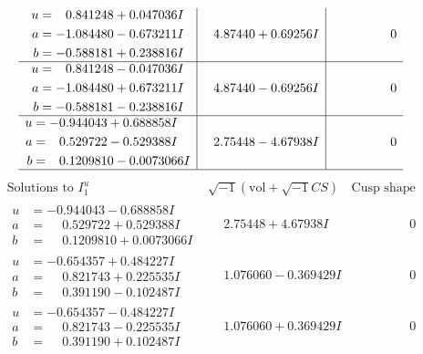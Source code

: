 \documentclass[1p]{elsarticle_modified}
\theoremstyle{definition}
\newcommand{\I}{\sqrt{-1}}
\begin{document}
$$\begin{array}{c|c|c}
\begin{aligned}
u &= \phantom{-}0.841248 + 0.047036 I \\
a &= -1.084480 - 0.673211 I \\
b &= -0.588181 + 0.238816 I\end{aligned}
 & \phantom{-}4.87440 + 0.69256 I & \phantom{-0.000000 } 0 \\ \hline\begin{aligned}
u &= \phantom{-}0.841248 - 0.047036 I \\
a &= -1.084480 + 0.673211 I \\
b &= -0.588181 - 0.238816 I\end{aligned}
 & \phantom{-}4.87440 - 0.69256 I & \phantom{-0.000000 } 0 \\ \hline\begin{aligned}
u &= -0.944043 + 0.688858 I \\
a &= \phantom{-}0.529722 - 0.529388 I \\
b &= \phantom{-}0.1209810 - 0.0073066 I\end{aligned}
 & \phantom{-}2.75448 - 4.67938 I & \phantom{-0.000000 } 0\\
 \hline 
 \end{array}$$\newpage$$\begin{array}{c|c|c}  
\text{Solutions to }I^u_{1}& \I (\text{vol} + \sqrt{-1}CS) & \text{Cusp shape}\\
 \hline 
\begin{aligned}
u &= -0.944043 - 0.688858 I \\
a &= \phantom{-}0.529722 + 0.529388 I \\
b &= \phantom{-}0.1209810 + 0.0073066 I\end{aligned}
 & \phantom{-}2.75448 + 4.67938 I & \phantom{-0.000000 } 0 \\ \hline\begin{aligned}
u &= -0.654357 + 0.484227 I \\
a &= \phantom{-}0.821743 + 0.225535 I \\
b &= \phantom{-}0.391190 - 0.102487 I\end{aligned}
 & \phantom{-}1.076060 - 0.369429 I & \phantom{-0.000000 } 0 \\ \hline\begin{aligned}
u &= -0.654357 - 0.484227 I \\
a &= \phantom{-}0.821743 - 0.225535 I \\
b &= \phantom{-}0.391190 + 0.102487 I\end{aligned}
 & \phantom{-}1.076060 + 0.369429 I & \phantom{-0.000000 } 0 \\ \hline\begin{aligned}

\end{aligned}
\end{array}$$
\end{document}
